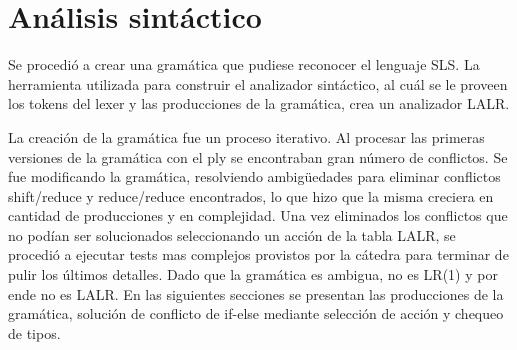 \section{Análisis sintáctico}

Se procedió a crear una gramática que pudiese reconocer el lenguaje SLS. 
La herramienta utilizada para construir el analizador sintáctico, al cuál se le proveen los tokens del lexer y las producciones de la gramática, crea un analizador LALR. 

La creación de la gramática fue un proceso iterativo. Al procesar las primeras versiones de la gramática con el ply se encontraban gran número de conflictos. Se fue modificando la gramática, resolviendo ambigüedades para eliminar conflictos shift/reduce y reduce/reduce encontrados, lo que hizo que la misma creciera en cantidad de producciones y en complejidad.
Una vez eliminados los conflictos que no podían ser solucionados seleccionando un acción  de la tabla LALR, se procedió a ejecutar tests mas complejos provistos por la cátedra para terminar de pulir los últimos detalles. Dado que la gramática es ambigua, no es LR(1) y por ende no es LALR. 
    En las siguientes secciones se presentan las producciones de la gramática, solución de conflicto de if-else mediante selección de acción y chequeo de tipos. 
    

